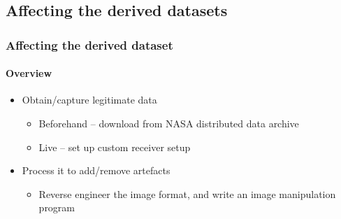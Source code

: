 \documentclass{beamer}
\begin{document}
\subsection{Affecting the derived datasets}

\begin{frame}
  \frametitle{Affecting the derived dataset}
  \framesubtitle{Overview}
  \begin{itemize}
    \item Obtain/capture legitimate data
    \begin{itemize}
      \item Beforehand -- download from NASA distributed data archive
      \item Live -- set up custom receiver setup
    \end{itemize}

    \item Process it to add/remove artefacts
    \begin{itemize}
      \item Reverse engineer the image format, and write an image manipulation program
    \end{itemize}
  \end{itemize}
\end{frame}

%   
% 
\end{document}

